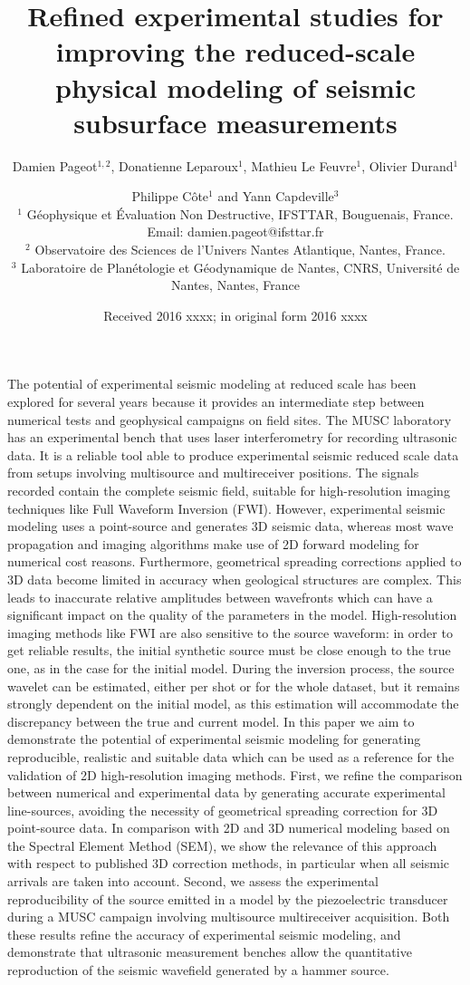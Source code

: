 \documentclass[extra,mreferee]{gji}
\title[Refined experimental studies for improving the reduced-scale physical modeling]
  {Refined experimental studies for improving the reduced-scale physical modeling of seismic subsurface measurements}
\author[D. Pageot \textit{et al.}]
  {Damien Pageot$^{1,2}$, Donatienne Leparoux$^1$, Mathieu Le Feuvre$^1$, Olivier Durand$^1$ \and Philippe C\^ote$^1$ and Yann Capdeville$^3$ \\
  $^1$ G\'eophysique et \'Evaluation Non Destructive, IFSTTAR, Bouguenais, France. Email: damien.pageot@ifsttar.fr \\
  $^2$ Observatoire des Sciences de l'Univers Nantes Atlantique, Nantes, France. \\
  $^3$ Laboratoire de Plan\'etologie et G\'eodynamique de Nantes, CNRS, Universit\'e de Nantes, Nantes, France \\
  }
\date{Received 2016 xxxx; in original form 2016 xxxx}
\begin{document}
\label{firstpage}

\maketitle

\begin{summary}
The potential of experimental seismic modeling at reduced scale has been explored for several years because it provides an intermediate step between numerical tests and geophysical campaigns on field sites. The MUSC laboratory has an experimental bench that uses laser interferometry for recording ultrasonic data. It is a reliable tool able to produce experimental seismic reduced scale data from setups involving multisource and multireceiver positions. The signals recorded contain the complete seismic field, suitable for high-resolution imaging techniques like Full Waveform Inversion (FWI). However, experimental seismic modeling uses a point-source and generates 3D seismic data, whereas most wave propagation and imaging algorithms make use of 2D forward modeling for numerical cost reasons. Furthermore, geometrical spreading corrections applied to 3D data become limited in accuracy when geological structures are complex. This leads to inaccurate relative amplitudes between wavefronts which can have a significant impact on the quality of the parameters in the model. High-resolution imaging methods like FWI are also sensitive to the source waveform: in order to get reliable results, the initial synthetic source must be close enough to the true one, as in the case for the initial model. During the inversion process, the source wavelet can be estimated, either per shot or for the whole dataset, but it remains strongly dependent on the initial model, as this estimation will accommodate the discrepancy between the true and current model. In this paper we aim to demonstrate the potential of experimental seismic modeling for generating reproducible, realistic and suitable data which can be used as a reference for the validation of 2D high-resolution imaging methods. First, we refine the comparison between numerical and experimental data by generating accurate experimental line-sources, avoiding the necessity of geometrical spreading correction for 3D point-source data. In comparison with 2D and 3D numerical modeling based on the Spectral Element Method (SEM), we show the relevance of this approach with respect to published 3D correction methods, in particular when all seismic arrivals are taken into account. Second, we assess the experimental reproducibility of the source emitted in a model by the piezoelectric transducer during a MUSC campaign involving multisource multireceiver acquisition. Both these results refine the accuracy of experimental seismic modeling, and demonstrate that ultrasonic measurement benches allow the quantitative reproduction of the seismic wavefield generated by a hammer source. 
\end{summary}
\end{document}
